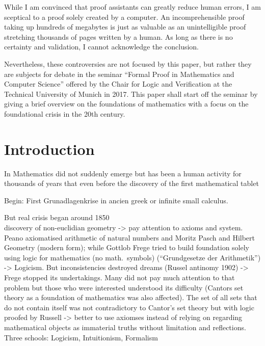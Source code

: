 \documentclass[hidelinks]{article}
\theoremstyle{plain}
\theoremstyle{definition}
\theoremstyle{rem}
\begin{document}
While I am convinced that proof assistants can greatly reduce human errors, I am sceptical to a proof solely created by a computer. An incomprehensible proof taking up hundreds of megabytes is just as valuable as an unintelligible proof stretching thousands of pages written by a human. As long as there is no certainty and validation, I cannot acknowledge the conclusion.

Nevertheless, these controversies are not focused by this paper, but rather they are subjects for debate in the seminar ``Formal Proof in Mathematics and Computer Science'' offered by the Chair for Logic and Verification at the Technical University of Munich in 2017. This paper shall start off the seminar by giving a brief overview on the foundations of mathematics with a focus on the foundational crisis in the 20th century.
\newpage

\tableofcontents 
\listoffigures 
\listoftables 
\newpage

\section{Introduction}
In 
Mathematics did not suddenly emerge but has been a human activity for thousands of years that even before the discovery of the first mathematical tablet


Begin: First Grunadlagenkrise in ancien greek or infinite small calculus.

But real crisis began around 1850\\
discovery of non-euclidian geometry -> pay attention to axioms and system.\\
Peano axiomatised arithmetic of natural numbers and Moritz Pasch and Hilbert Geometry (modern form); while Gottlob Frege tried to build foundation solely using logic for mathematics (no math.\ symbols) (``Grundgesetze der Arithmetik'') -> Logicism. But inconsistencies destroyed dreams (Russel antinomy 1902) -> Frege stopped its undertakings.
Many did not pay much attention to that problem but those who were interested understood its difficulty (Cantors set theory as a foundation of mathematics was also affected).
The set of all sets that do not contain itself was not contradictory to Cantor's set theory but with logic proofed by Russell -> better to use axiomses instead of relying on regarding mathematical objects as immaterial truths without limitation and reflections.\\

Three schools: Logicism, Intuitionism, Formalism\\
\end{document}
